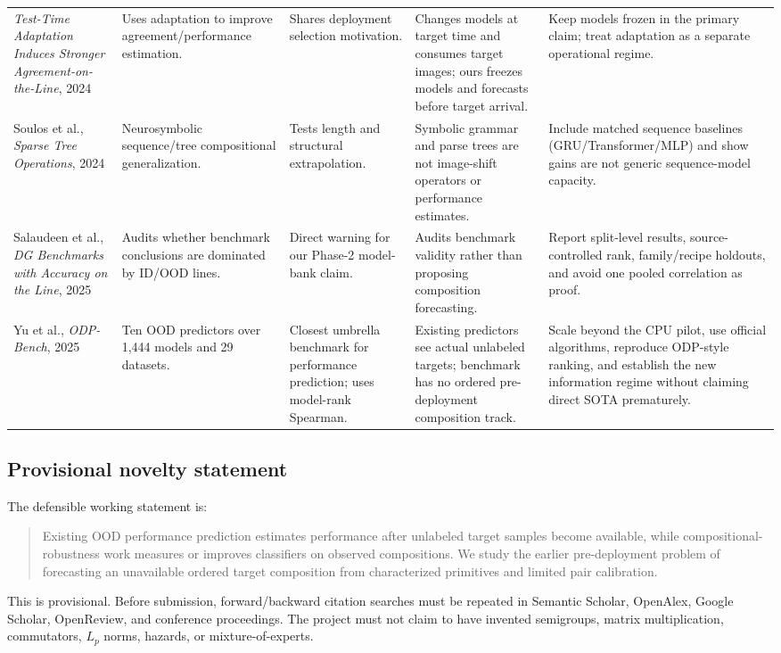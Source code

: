 \documentclass[11pt,a4paper]{article}
\begin{document}
\begin{landscape}
\begin{longtable}{P{3.1cm}P{3.4cm}P{4.4cm}P{4.4cm}P{5.0cm}}
\emph{Test-Time Adaptation Induces Stronger Agreement-on-the-Line}, 2024 \cite{ttaagreement2024}
& Uses adaptation to improve agreement/performance estimation.
& Shares deployment selection motivation.
& Changes models at target time and consumes target images; ours freezes models and forecasts before target arrival.
& Keep models frozen in the primary claim; treat adaptation as a separate operational regime. \\

Soulos et al., \emph{Sparse Tree Operations}, 2024 \cite{soulos2024}
& Neurosymbolic sequence/tree compositional generalization.
& Tests length and structural extrapolation.
& Symbolic grammar and parse trees are not image-shift operators or performance estimates.
& Include matched sequence baselines (GRU/Transformer/MLP) and show gains are not generic sequence-model capacity. \\

Salaudeen et al., \emph{DG Benchmarks with Accuracy on the Line}, 2025 \cite{dgmisspecified2025}
& Audits whether benchmark conclusions are dominated by ID/OOD lines.
& Direct warning for our Phase-2 model-bank claim.
& Audits benchmark validity rather than proposing composition forecasting.
& Report split-level results, source-controlled rank, family/recipe holdouts, and avoid one pooled correlation as proof. \\

Yu et al., \emph{ODP-Bench}, 2025 \cite{yu2025}
& Ten OOD predictors over 1,444 models and 29 datasets.
& Closest umbrella benchmark for performance prediction; uses model-rank Spearman.
& Existing predictors see actual unlabeled targets; benchmark has no ordered pre-deployment composition track.
& Scale beyond the CPU pilot, use official algorithms, reproduce ODP-style ranking, and establish the new information regime without claiming direct SOTA prematurely. \\

\end{longtable}
\end{landscape}

\subsection{Provisional novelty statement}

The defensible working statement is:
\begin{quote}
Existing OOD performance prediction estimates performance after unlabeled target
samples become available, while compositional-robustness work measures or
improves classifiers on observed compositions.  We study the earlier
pre-deployment problem of forecasting an unavailable ordered target composition
from characterized primitives and limited pair calibration.
\end{quote}
This is provisional.  Before submission, forward/backward citation searches
must be repeated in Semantic Scholar, OpenAlex, Google Scholar, OpenReview, and
conference proceedings.  The project must not claim to have invented
semigroups, matrix multiplication, commutators, $L_p$ norms, hazards, or
mixture-of-experts.
\end{document}
